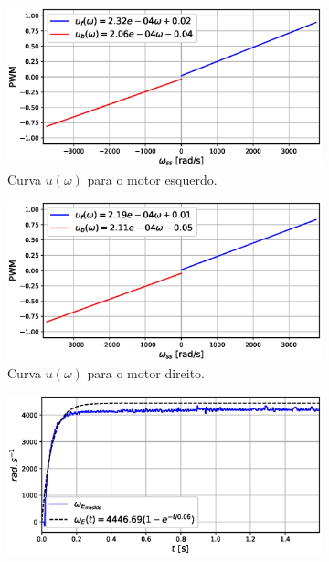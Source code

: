 \begin{figure}[H]
    \begin{subfigure}{.5\textwidth}
    \centering
    \includegraphics[width=\textwidth]{figuras/resultados/exp02/curva_feedforward_esquerdo100.eps}
    \caption{Curva $u(\omega)$ para o motor esquerdo.}
    \label{fig:exp02:curva_feedforward_esquerdo}
    \end{subfigure}
    \hfill
    \begin{subfigure}{.5\textwidth}
    \centering
    \includegraphics[width=\textwidth]{figuras/resultados/exp02/curva_feedforward_direito100.eps}
    \caption{Curva $u(\omega)$ para o motor direito.}
    \label{fig:exp02:curva_feedforward_direito}
    \end{subfigure}
    \begin{subfigure}{.5\textwidth}
    \centering
    \includegraphics[width=\textwidth]{figuras/resultados/exp02/regressao_vs_medido_esquerdo100.eps}

\end{subfigure}
\end{figure}
